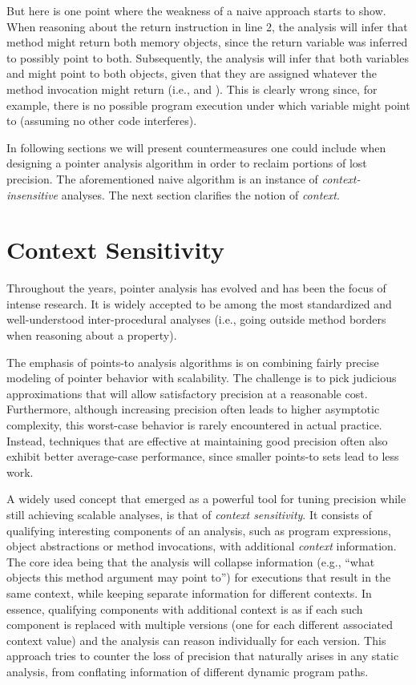 But here is one point where the weakness of a naive approach starts to show. When reasoning about the return instruction in line 2, the analysis will infer that method  might return both memory objects, since the return variable was inferred to possibly point to both. Subsequently, the analysis will infer that both variables  and  might point to both objects, given that they are assigned whatever the method invocation might return (i.e.,  and ). This is clearly wrong since, for example, there is no possible program execution under which variable  might point to  (assuming no other code interferes).

In following sections we will present countermeasures one could include when designing a pointer analysis algorithm in order to reclaim portions of lost precision. The aforementioned naive algorithm is an instance of \emph{context-insensitive} analyses. The next section clarifies the notion of \emph{context}.


\section{Context Sensitivity}
\label{sec:back:context}

Throughout the years, pointer analysis has evolved and has been the focus of intense research. It is widely accepted to be among the most standardized and well-understood inter-procedural analyses (i.e., going outside method borders when reasoning about a property).

The emphasis of points-to analysis algorithms is on combining fairly precise modeling of pointer behavior with scalability. The challenge is to pick judicious approximations that will allow satisfactory precision at a reasonable cost. Furthermore, although increasing precision often leads to higher asymptotic complexity, this worst-case behavior is rarely encountered in actual practice. Instead, techniques that are effective at maintaining good precision often also exhibit better average-case performance, since smaller points-to sets lead to less work.

A widely used concept that emerged as a powerful tool for tuning precision while still achieving scalable analyses, is that of \emph{context sensitivity}. It consists of qualifying interesting components of an analysis, such as program expressions, object abstractions or method invocations, with additional \emph{context} information. The core idea being that the analysis will collapse information (e.g., ``what objects this method argument may point to'') for executions that result in the same context, while keeping separate information for different contexts. In essence, qualifying components with additional context is as if each such component is replaced with multiple versions (one for each different associated context value) and the analysis can reason individually for each version. This approach tries to counter the loss of precision that naturally arises in any static analysis, from conflating information of different dynamic program paths.

